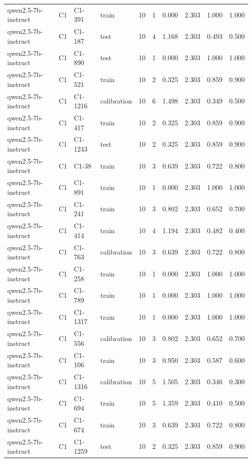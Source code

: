 \begin{table}
\begin{tabular}{llllrrrrrr}
qwen2.5-7b-instruct & C1 & C1-391 & train & 10 & 1 & 0.000 & 2.303 & 1.000 & 1.000 \\
qwen2.5-7b-instruct & C1 & C1-187 & test & 10 & 4 & 1.168 & 2.303 & 0.493 & 0.500 \\
qwen2.5-7b-instruct & C1 & C1-890 & test & 10 & 1 & 0.000 & 2.303 & 1.000 & 1.000 \\
qwen2.5-7b-instruct & C1 & C1-521 & train & 10 & 2 & 0.325 & 2.303 & 0.859 & 0.900 \\
qwen2.5-7b-instruct & C1 & C1-1216 & calibration & 10 & 6 & 1.498 & 2.303 & 0.349 & 0.500 \\
qwen2.5-7b-instruct & C1 & C1-417 & train & 10 & 2 & 0.325 & 2.303 & 0.859 & 0.900 \\
qwen2.5-7b-instruct & C1 & C1-1243 & test & 10 & 2 & 0.325 & 2.303 & 0.859 & 0.900 \\
qwen2.5-7b-instruct & C1 & C1-38 & train & 10 & 3 & 0.639 & 2.303 & 0.722 & 0.800 \\
qwen2.5-7b-instruct & C1 & C1-891 & train & 10 & 1 & 0.000 & 2.303 & 1.000 & 1.000 \\
qwen2.5-7b-instruct & C1 & C1-241 & train & 10 & 3 & 0.802 & 2.303 & 0.652 & 0.700 \\
qwen2.5-7b-instruct & C1 & C1-414 & train & 10 & 4 & 1.194 & 2.303 & 0.482 & 0.400 \\
qwen2.5-7b-instruct & C1 & C1-763 & calibration & 10 & 3 & 0.639 & 2.303 & 0.722 & 0.800 \\
qwen2.5-7b-instruct & C1 & C1-258 & train & 10 & 1 & 0.000 & 2.303 & 1.000 & 1.000 \\
qwen2.5-7b-instruct & C1 & C1-789 & train & 10 & 1 & 0.000 & 2.303 & 1.000 & 1.000 \\
qwen2.5-7b-instruct & C1 & C1-1317 & train & 10 & 1 & 0.000 & 2.303 & 1.000 & 1.000 \\
qwen2.5-7b-instruct & C1 & C1-556 & calibration & 10 & 3 & 0.802 & 2.303 & 0.652 & 0.700 \\
qwen2.5-7b-instruct & C1 & C1-106 & train & 10 & 3 & 0.950 & 2.303 & 0.587 & 0.600 \\
qwen2.5-7b-instruct & C1 & C1-1316 & calibration & 10 & 5 & 1.505 & 2.303 & 0.346 & 0.300 \\
qwen2.5-7b-instruct & C1 & C1-694 & train & 10 & 5 & 1.359 & 2.303 & 0.410 & 0.500 \\
qwen2.5-7b-instruct & C1 & C1-674 & train & 10 & 3 & 0.639 & 2.303 & 0.722 & 0.800 \\
qwen2.5-7b-instruct & C1 & C1-1259 & test & 10 & 2 & 0.325 & 2.303 & 0.859 & 0.900 \\

\end{tabular}
\end{table}
